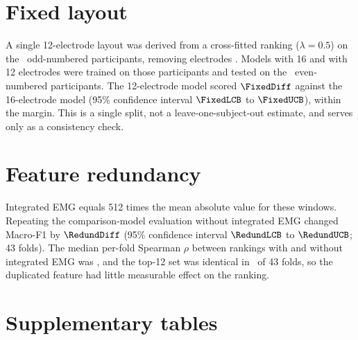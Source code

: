 \documentclass{iopjournal}
\begin{document}
\section{Fixed layout}
\label{app:fixed}
A single 12-electrode layout was derived from a cross-fitted ranking ($\lambda = 0.5$) on the \FixedDev\ odd-numbered participants, removing electrodes \FixedDropped. Models with 16 and with 12 electrodes were trained on those participants and tested on the \FixedTest\ even-numbered participants. The 12-electrode model scored $\FixedDiff$ against the 16-electrode model (95\% confidence interval $\FixedLCB$ to $\FixedUCB$), within the margin. This is a single split, not a leave-one-subject-out estimate, and serves only as a consistency check.

\section{Feature redundancy}
\label{app:redund}
Integrated EMG equals 512 times the mean absolute value for these windows. Repeating the comparison-model evaluation without integrated EMG changed Macro-F1 by $\RedundDiff$ (95\% confidence interval $\RedundLCB$ to $\RedundUCB$; 43 folds). The median per-fold Spearman $\rho$ between rankings with and without integrated EMG was \RedundRho, and the top-12 set was identical in \RedundTopTwelveSame\ of 43 folds, so the duplicated feature had little measurable effect on the ranking.

\section{Supplementary tables}






\end{document}

